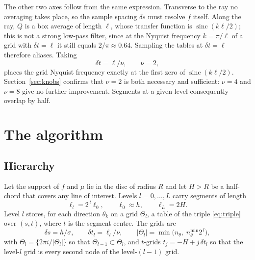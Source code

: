 \documentclass[11pt]{article}
\begin{document}
The other two axes follow from the same expression. Transverse to the ray no
averaging takes place, so the sample spacing $\delta s$ must resolve $f$
itself. Along the ray, $Q$ is a box average of length $\ell$, whose transfer
function is $\operatorname{sinc}(k\ell/2)$; this is not a strong low-pass
filter, since at the Nyquist frequency $k=\pi/\ell$ of a grid with
$\delta t=\ell$ it still equals $2/\pi\approx0.64$. Sampling the tables at
$\delta t=\ell$ therefore aliases. Taking
\begin{equation}
  \delta t=\ell/\nu,\qquad \nu=2,
  \label{eq:tcrit}
\end{equation}
places the grid Nyquist frequency exactly at the first zero of
$\operatorname{sinc}(k\ell/2)$. Section~\ref{sec:knobs} confirms that $\nu=2$
is both necessary and sufficient: $\nu=4$ and $\nu=8$ give no further
improvement. Segments at a given level consequently overlap by half.

\section{The algorithm}
\label{sec:algorithm}

\subsection{Hierarchy}

Let the support of $f$ and $\mu$ lie in the disc of radius $R$ and let
$H>R$ be a half-chord that covers any line of interest. Levels
$l=0,\dots,L$ carry segments of length
\begin{equation}
  \ell_l = 2^{\,l}\ell_0,\qquad \ell_0\approx h,\qquad \ell_L = 2H .
\end{equation}
Level $l$ stores, for each direction $\theta_k$ on a grid $\Theta_l$, a table
of the triple \eqref{eq:triple} over $(s,t)$, where $t$ is the segment centre.
The grids are
\begin{equation}
  \delta s = h/\sigma,\qquad
  \delta t_l = \ell_l/\nu,\qquad
  |\Theta_l| = \min\big(n_\theta,\; n_\theta^{\min}2^{\,l}\big),
  \label{eq:schedule}
\end{equation}
with $\Theta_l=\{2\pi i/|\Theta_l| \}$ so that $\Theta_{l-1}\subset\Theta_l$,
and $t$-grids $t_j=-H+j\,\delta t_l$ so that the level-$l$ grid is every second
node of the level-$(l-1)$ grid.
\end{document}
